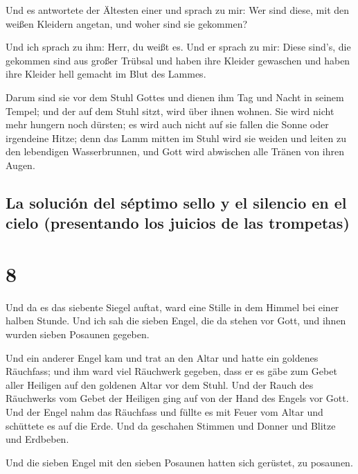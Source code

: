  Und es antwortete der Ältesten einer und sprach zu mir:
Wer sind diese, mit den weißen Kleidern angetan, und woher sind sie
gekommen?

 Und ich sprach zu ihm: Herr, du weißt es. Und er sprach
zu mir: Diese sind's, die gekommen sind aus großer Trübsal und haben
ihre Kleider gewaschen und haben ihre Kleider hell gemacht im Blut des
Lammes.

 Darum sind sie vor dem Stuhl Gottes und dienen ihm Tag
und Nacht in seinem Tempel; und der auf dem Stuhl sitzt, wird über ihnen
wohnen.  Sie wird nicht mehr hungern noch dürsten; es
wird auch nicht auf sie fallen die Sonne oder irgendeine Hitze;
 denn das Lamm mitten im Stuhl wird sie weiden und leiten
zu den lebendigen Wasserbrunnen, und Gott wird abwischen alle Tränen von
ihren Augen.

\hypertarget{la-soluciuxf3n-del-suxe9ptimo-sello-y-el-silencio-en-el-cielo-presentando-los-juicios-de-las-trompetas}{%
\subsection{La solución del séptimo sello y el silencio en el cielo
(presentando los juicios de las
trompetas)}\label{la-soluciuxf3n-del-suxe9ptimo-sello-y-el-silencio-en-el-cielo-presentando-los-juicios-de-las-trompetas}}

\hypertarget{section-7}{%
\section{8}\label{section-7}}

 Und da es das siebente Siegel auftat, ward eine Stille in
dem Himmel bei einer halben Stunde.  Und ich sah die
sieben Engel, die da stehen vor Gott, und ihnen wurden sieben Posaunen
gegeben.

 Und ein anderer Engel kam und trat an den Altar und hatte
ein goldenes Räuchfass; und ihm ward viel Räuchwerk gegeben, dass er es
gäbe zum Gebet aller Heiligen auf den goldenen Altar vor dem Stuhl.
 Und der Rauch des Räuchwerks vom Gebet der Heiligen ging
auf von der Hand des Engels vor Gott.  Und der Engel nahm
das Räuchfass und füllte es mit Feuer vom Altar und schüttete es auf die
Erde. Und da geschahen Stimmen und Donner und Blitze und Erdbeben.

 Und die sieben Engel mit den sieben Posaunen hatten sich
gerüstet, zu posaunen.

